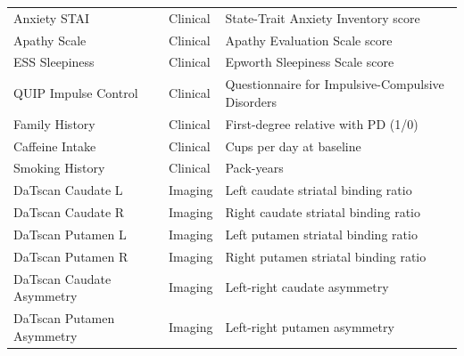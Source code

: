 \documentclass[11pt]{article}
\begin{document}
\begin{longtable}{p{} p{} p{}}
Anxiety STAI & Clinical & State-Trait Anxiety Inventory score \\
Apathy Scale & Clinical & Apathy Evaluation Scale score \\
ESS Sleepiness & Clinical & Epworth Sleepiness Scale score \\
QUIP Impulse Control & Clinical & Questionnaire for Impulsive-Compulsive Disorders \\
Family History & Clinical & First-degree relative with PD (1/0) \\
Caffeine Intake & Clinical & Cups per day at baseline \\
Smoking History & Clinical & Pack-years \\

DaTscan Caudate L & Imaging & Left caudate striatal binding ratio \\
DaTscan Caudate R & Imaging & Right caudate striatal binding ratio \\
DaTscan Putamen L & Imaging & Left putamen striatal binding ratio \\
DaTscan Putamen R & Imaging & Right putamen striatal binding ratio \\
DaTscan Caudate Asymmetry & Imaging & Left-right caudate asymmetry \\
DaTscan Putamen Asymmetry & Imaging & Left-right putamen asymmetry \\


\end{longtable}
\end{document}
